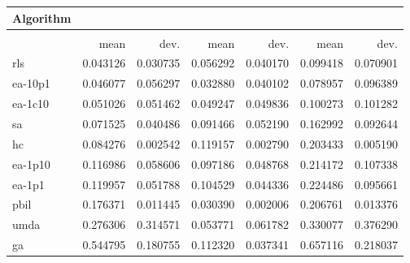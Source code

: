 \begin{tabular}{@{} l *{6}{>{{}}N{1}{2}} @{}}
\toprule
{Algorithm} &  \\
\midrule
&  &  &  \\
\midrule
& {mean} & {dev.} & {mean} & {dev.} & {mean} & {dev.} \\
\midrule
rls & 0.043126 & 0.030735 & 0.056292 & 0.040170 & 0.099418 & 0.070901 \\
ea-10p1 & 0.046077 & 0.056297 & 0.032880 & 0.040102 & 0.078957 & 0.096389 \\
ea-1c10 & 0.051026 & 0.051462 & 0.049247 & 0.049836 & 0.100273 & 0.101282 \\
sa & 0.071525 & 0.040486 & 0.091466 & 0.052190 & 0.162992 & 0.092644 \\
hc & 0.084276 & 0.002542 & 0.119157 & 0.002790 & 0.203433 & 0.005190 \\
ea-1p10 & 0.116986 & 0.058606 & 0.097186 & 0.048768 & 0.214172 & 0.107338 \\
ea-1p1 & 0.119957 & 0.051788 & 0.104529 & 0.044336 & 0.224486 & 0.095661 \\
pbil & 0.176371 & 0.011445 & 0.030390 & 0.002006 & 0.206761 & 0.013376 \\
umda & 0.276306 & 0.314571 & 0.053771 & 0.061782 & 0.330077 & 0.376290 \\
ga & 0.544795 & 0.180755 & 0.112320 & 0.037341 & 0.657116 & 0.218037 \\
\bottomrule
\end{tabular}
